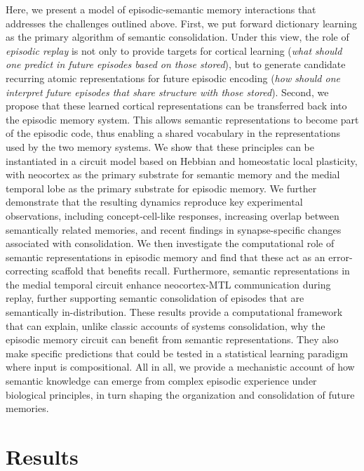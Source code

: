 \documentclass{article}
\begin{document}
Here, we present a model of episodic-semantic memory interactions that addresses the challenges outlined above. First, we put forward dictionary learning as the primary algorithm of semantic consolidation. Under this view, the role of \textit{episodic replay} is not only to provide targets for cortical learning (\textit{what should one predict in future episodes based on those stored}), but to generate candidate recurring atomic representations for future episodic encoding (\textit{how should one interpret future episodes that share structure with those stored}). Second, we propose that these learned cortical representations can be transferred back into the episodic memory system. This allows semantic representations to become part of the episodic code, thus enabling a shared vocabulary in the representations used by the two memory systems. We show that these principles can be instantiated in a circuit model based on Hebbian and homeostatic local plasticity, with neocortex as the primary substrate for semantic memory and the medial temporal lobe as the primary substrate for episodic memory. We further demonstrate that the resulting dynamics reproduce key experimental observations, including concept-cell-like responses, increasing overlap between semantically related memories, and recent findings in synapse-specific changes associated with consolidation. We then investigate the computational role of semantic representations in episodic memory and find that these act as an error-correcting scaffold that benefits recall. Furthermore, semantic representations in the medial temporal circuit enhance neocortex-MTL communication during replay, further supporting semantic consolidation of episodes that are semantically in-distribution. These results provide a computational framework that can explain, unlike classic accounts of systems consolidation, why the episodic memory circuit can benefit from semantic representations. They also make specific predictions that could be tested in a statistical learning paradigm where input is compositional. All in all, we provide a mechanistic account of how semantic knowledge can emerge from complex episodic experience under biological principles, in turn shaping the organization and consolidation of future memories.
\newpage
\section*{Results}
\end{document}
